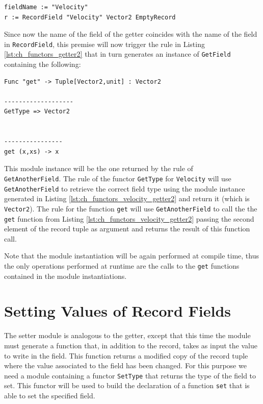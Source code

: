 \begin{lstlisting}
fieldName := "Velocity"
r := RecordField "Velocity" Vector2 EmptyRecord
\end{lstlisting}

Since now the name of the field of the getter coincides with the name of the field in \texttt{RecordField}, this premise will now trigger the rule in Listing \ref{lst:ch_functors_getter2} that in turn generates an instance of \texttt{GetField} containing the following:

\begin{lstlisting}[caption = Getter for Velocity generated by \texttt{GetAnotherField}, label = lst:ch_functors_velocity_getter2]
Func "get" -> Tuple[Vector2,unit] : Vector2

-------------------
GetType => Vector2


----------------
get (x,xs) -> x
\end{lstlisting}

\noindent
This module instance will be the one returned by the rule of\\ \texttt{GetAnotherField}. The rule of the functor \texttt{GetType} for \texttt{Velocity} will use \texttt{GetAnotherField} to retrieve the correct field type using the module instance generated in Listing \ref{lst:ch_functors_velocity_getter2} and return it (which is \texttt{Vector2}). The rule for the function \texttt{get} will use \texttt{GetAnotherField} to call the the \texttt{get} function from Listing \ref{lst:ch_functors_velocity_getter2} passing the second element of the record tuple as argument and returns the result of this function call.

Note that the module instantiation will be again performed at compile time, thus the only operations performed at runtime are the calls to the \texttt{get} functions contained in the module instantiations.

\section{Setting Values of Record Fields}
\label{sec:ch_functors_record_setter}
The setter module is analogous to the getter, except that this time the module must generate a function that, in addition to the record, takes as input the value to write in the field. This function returns a modified copy of the record tuple where the value associated to the field has been changed. For this purpose we need a module containing a functor \texttt{SetType} that returns the type of the field to set. This functor will be used to build the declaration of a function \texttt{set} that is able to set the specified field.

